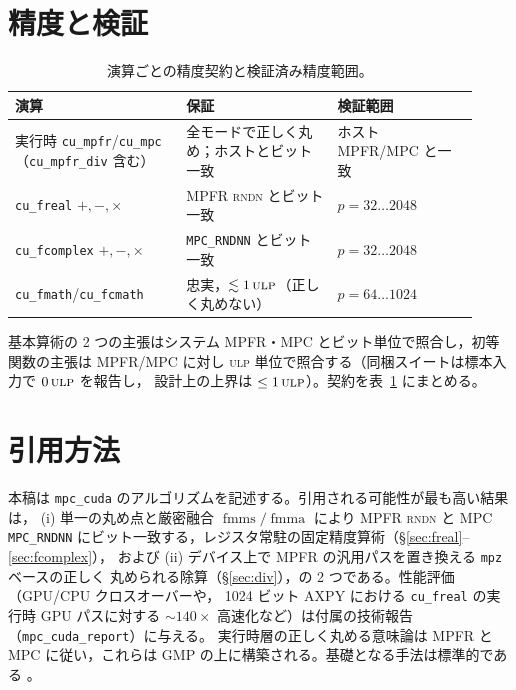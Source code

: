 \documentclass[uplatex,dvipdfmx,a4paper,11pt]{jsarticle}
\newcommand{\code}[1]{\texttt{#1}}
\newcommand{\PB}{\ensuremath{p}}
\newcommand{\ulp}{\textsc{ulp}}
\newcommand{\rndn}{\textsc{rndn}}
\newcommand{\fmma}{\ensuremath{\operatorname{fmma}}}
\newcommand{\fmms}{\ensuremath{\operatorname{fmms}}}
\begin{document}
\section{精度と検証}
\label{sec:accuracy}

\begin{table}[h]
\centering
\begin{tabular}{@{}p{0.34\linewidth}p{0.30\linewidth}p{0.28\linewidth}@{}}
\toprule
演算 & 保証 & 検証範囲\\
\midrule
実行時 \code{cu\_mpfr}/\code{cu\_mpc}（\code{cu\_mpfr\_div} 含む） & 全モードで正しく丸め；ホストとビット一致 & ホスト MPFR/MPC と一致\\
\code{cu\_freal} $+,-,\times$ & MPFR \rndn{} とビット一致 & $\PB=32\ldots2048$\\
\code{cu\_fcomplex} $+,-,\times$ & \code{MPC\_RNDNN} とビット一致 & $\PB=32\ldots2048$\\
\code{cu\_fmath}/\code{cu\_fcmath} & 忠実，$\lesssim 1\,\ulp$（正しく丸めない） & $\PB=64\ldots1024$\\
\bottomrule
\end{tabular}
\caption{演算ごとの精度契約と検証済み精度範囲。}
\label{tab:accuracy}
\end{table}

基本算術の 2 つの主張はシステム MPFR・MPC とビット単位で照合し，初等関数の主張は
MPFR/MPC に対し \ulp{} 単位で照合する（同梱スイートは標本入力で $0\,\ulp$ を報告し，
設計上の上界は $\le 1\,\ulp$）。契約を表~\ref{tab:accuracy} にまとめる。


\section{引用方法}
\label{sec:cite}

本稿は \code{mpc\_cuda} のアルゴリズムを記述する。引用される可能性が最も高い結果は，
(i) 単一の丸め点と厳密融合 $\fmms/\fmma$ により MPFR \rndn{} と MPC \code{MPC\_RNDNN}
にビット一致する，レジスタ常駐の固定精度算術（\S\ref{sec:freal}--\ref{sec:fcomplex}），
および (ii) デバイス上で MPFR の汎用パスを置き換える \code{mpz} ベースの正しく
丸められる除算（\S\ref{sec:div}），の 2 つである。性能評価（GPU/CPU クロスオーバーや，
1024 ビット AXPY における \code{cu\_freal} の実行時 GPU パスに対する
$\sim\!140\times$ 高速化など）は付属の技術報告（\code{mpc\_cuda\_report}）に与える。
実行時層の正しく丸める意味論は MPFR \cite{MPFR} と MPC \cite{MPC} に従い，これらは
GMP \cite{GMP} の上に構築される。基礎となる手法は標準的である
\cite{BrentZimmermann,Muller}。
\end{document}
